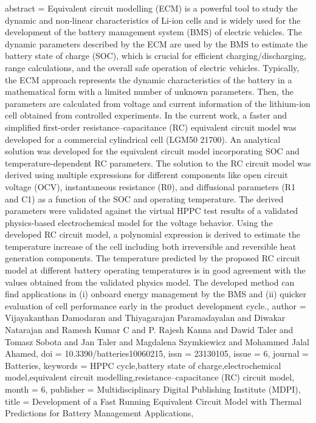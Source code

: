 {{{{{{{{{{{   abstract = {Equivalent circuit modelling (ECM) is a powerful tool to study the dynamic and non-linear characteristics of Li-ion cells and is widely used for the development of the battery management system (BMS) of electric vehicles. The dynamic parameters described by the ECM are used by the BMS to estimate the battery state of charge (SOC), which is crucial for efficient charging/discharging, range calculations, and the overall safe operation of electric vehicles. Typically, the ECM approach represents the dynamic characteristics of the battery in a mathematical form with a limited number of unknown parameters. Then, the parameters are calculated from voltage and current information of the lithium-ion cell obtained from controlled experiments. In the current work, a faster and simplified first-order resistance–capacitance (RC) equivalent circuit model was developed for a commercial cylindrical cell (LGM50 21700). An analytical solution was developed for the equivalent circuit model incorporating SOC and temperature-dependent RC parameters. The solution to the RC circuit model was derived using multiple expressions for different components like open circuit voltage (OCV), instantaneous resistance (R0), and diffusional parameters (R1 and C1) as a function of the SOC and operating temperature. The derived parameters were validated against the virtual HPPC test results of a validated physics-based electrochemical model for the voltage behavior. Using the developed RC circuit model, a polynomial expression is derived to estimate the temperature increase of the cell including both irreversible and reversible heat generation components. The temperature predicted by the proposed RC circuit model at different battery operating temperatures is in good agreement with the values obtained from the validated physics model. The developed method can find applications in (i) onboard energy management by the BMS and (ii) quicker evaluation of cell performance early in the product development cycle.},
   author = {Vijayakanthan Damodaran and Thiyagarajan Paramadayalan and Diwakar Natarajan and Ramesh Kumar C and P. Rajesh Kanna and Dawid Taler and Tomasz Sobota and Jan Taler and Magdalena Szymkiewicz and Mohammed Jalal Ahamed},
   doi = {10.3390/batteries10060215},
   issn = {23130105},
   issue = {6},
   journal = {Batteries},
   keywords = {HPPC cycle,battery state of charge,electrochemical model,equivalent circuit modelling,resistance–capacitance (RC) circuit model},
   month = {6},
   publisher = {Multidisciplinary Digital Publishing Institute (MDPI)},
   title = {Development of a Fast Running Equivalent Circuit Model with Thermal Predictions for Battery Management Applications},
}}}}}}}}}}}
